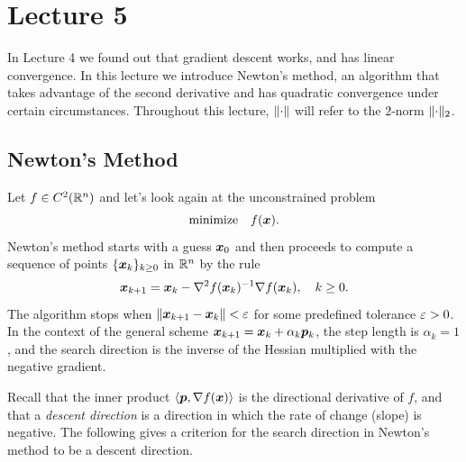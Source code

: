 %
%
% 


\chapter*{Lecture 5}
\setcounter{chapter}{5}
\setcounter{section}{0}
\setcounter{equation}{0}
\setcounter{theorem}{0}


In Lecture 4 we found out that gradient descent works, and has linear convergence. In this lecture we introduce Newton's method, an algorithm that takes advantage of the second derivative and has quadratic convergence under certain circumstances. Throughout this lecture, $\Vert {\cdot}\Vert$ will refer to the $2$-norm $\Vert {\cdot}\Vert_2$.

\section{Newton's Method}
Let $f\in C^2(\mathbb{R}^n)$ and let's look again at the unconstrained problem
\begin{equation*}
 \text{minimize}\quad f(\bm{x}).
\end{equation*}
Newton's method starts with a guess $\bm{x}_0$ and then proceeds to compute a sequence of points $\{\bm{x}_k\}_{k\geq 0}$ in $\mathbb{R}^n$ by the rule
\begin{equation}\label{eq:newton}
 \bm{x}_{k+1} = \bm{x}_k - \nabla^2 f(\bm{x}_k)^{-1}\nabla f(\bm{x}_k), \quad k\geq 0.
\end{equation}
The algorithm stops when $\Vert {\bm{x}_{k+1}-\bm{x}_k}\Vert<\varepsilon$ for some predefined tolerance $\varepsilon>0$.
In the context of the general scheme $\bm{x}_{k+1}=\bm{x}_k+\alpha_k\bm{p}_k$, the step length is $\alpha_k=1$, and the search direction is the inverse of the Hessian multiplied with the negative gradient. 

Recall that the inner product $\langle {\bm{p}}, {\nabla f(\bm{x})} \rangle$ is the directional
derivative of $f$,
and that a {\em descent direction} is a direction in which the rate of change (slope) is negative. The following gives a criterion for the search direction in Newton's method to be a descent direction.

